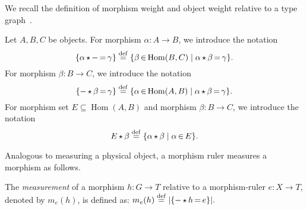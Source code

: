 We recall the definition of morphism weight and object weight relative to a type graph~\cite{endrullis2024generalized_icgt}.

\begin{notation}
Let \(A,B,C\) be objects. For morphism $\alpha\mathop{\colon} A \mathop{\to} B$, we introduce the notation 
          $$\{ \alpha \mathop{\star} - \mathop{=} \gamma \} \overset{\operatorname{def}}{=} \{ \beta \mathop{\in} \operatorname{Hom}(B, C) \mid \alpha \mathop{\star} \beta \mathop{=} \gamma \}.$$ 
For morphism $\beta\mathop{\colon} B \mathop{\to} C$, we introduce the notation
          $$\{ - \mathop{\star} \beta \mathop{=} \gamma \}  \overset{\operatorname{def}}{=} \{ \alpha \mathop{\in} \operatorname{Hom}(A, B) \mid \alpha \mathop{\star} \beta \mathop{=} \gamma \}.$$
For morphism set $E \mathop{\subseteq} \operatorname{Hom}(A,B)$ and morphism $\beta\mathop{\colon} B \mathop{\to} C$, we introduce the notation
          $$E \mathop{\star} \beta \overset{\operatorname{def}}{=} \{ \alpha \mathop{\star} \beta \mid \alpha \mathop{\in} E \}.$$
\end{notation}
Analogous to measuring a physical object, a morphism ruler measures a morphism as follows.
\begin{definition} 
    \label{def:measurement_of_a_morphism_relative_to_a_morphism_ruler}
    The \emph{measurement} of a morphism \( h:G \mathop{\to} T \) relative to a morphism-ruler \( e: X \mathop{\to} T \), denoted by $m_e(h)$, is defined as:
                \(
                m_e(h) 
                    \overset{\operatorname{def}}{=}
                |\{- \mathop{\star} h \mathop{=} e\}|.
                \)
\end{definition}


